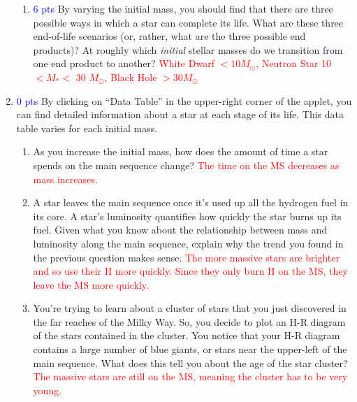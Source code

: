 \documentclass[11pt]{article}
\begin{document}
\begin{enumerate}
\begin{enumerate}
        \item \textcolor{blue}{6 pts} By varying the initial mass, you should find that there are three possible ways in which a star can complete its life. What are these three end-of-life scenarios (or, rather, what are the three possible end products)? At roughly which \emph{initial} stellar masses do we transition from one end product to another?
        \textcolor{red}{White Dwarf $<10 M_\odot$, Neutron Star 10 $< M_* <$ 30 $M_\odot$, Black Hole $> 30 M_\odot$}
        
    \end{enumerate}
    
    \item \textcolor{blue}{0 pts} By clicking on ``Data Table'' in the upper-right corner of the applet, you can find detailed information about a star at each stage of its life. This data table varies for each initial mass. 
    \begin{enumerate}
        \item As you increase the initial mass, how does the amount of time a star spends on the main sequence change?
        \textcolor{red}{The time on the MS decreases as mass increases.}
        
        \item A star leaves the main sequence once it's used up all the hydrogen fuel in its core. A star's luminosity quantifies how quickly the star burns up its fuel. Given what you know about the relationship between mass and luminosity along the main sequence, explain why the trend you found in the previous question makes sense.
        \textcolor{red}{The more massive stars are brighter and so use their H more quickly.  Since they only burn H on the MS, they leave the MS more quickly.}
        
        \item You're trying to learn about a cluster of stars that you just discovered in the far reaches of the Milky Way. So, you decide to plot an H-R diagram of the stars contained in the cluster. You notice that your H-R diagram contains a large number of blue giants, or stars near the upper-left of the main sequence. What does this tell you about the age of the star cluster?
        \textcolor{red}{The massive stars are still on the MS, meaning the cluster has to be very young.}
        
    \end{enumerate}
\end{enumerate}
\end{document}
